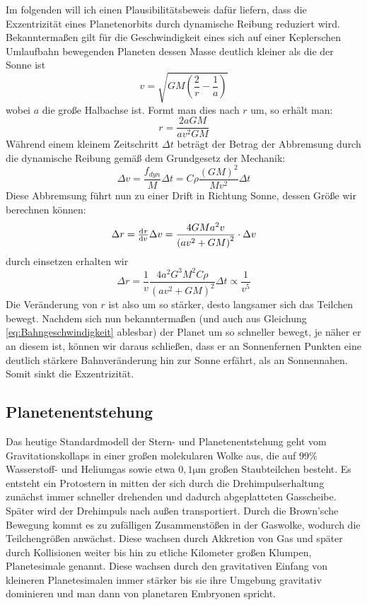 \documentclass[12pt,a4paper,twoside]{article}
\renewcommand{\cite}{\citep}
\begin{document}
Im folgenden will ich einen Plausibilitätsbeweis dafür liefern, dass die Exzentrizität eines Planetenorbits durch dynamische Reibung reduziert wird.
Bekanntermaßen gilt für die Geschwindigkeit eines sich auf einer Keplerschen Umlaufbahn bewegenden Planeten dessen Masse deutlich kleiner als die der Sonne ist
\begin{equation}\label{eq:Bahngeschwindigkeit}
v= \sqrt{GM\left(\frac{2}{r}-\frac{1}{a}\right)}
\end{equation}
wobei $a$ die große Halbachse ist. Formt man dies nach $r$ um, so erhält man:
\begin{equation}
r = \frac{2aGM}{av^2GM}
\end{equation}
Während einem kleinem Zeitschritt $\Delta t$ beträgt der Betrag der Abbremsung durch die dynamische Reibung gemäß dem Grundgesetz der Mechanik:
\begin{equation}
\Delta v = \frac{f_{dyn}}{M} \Delta t = C \rho \frac{\left(GM\right)^2}{Mv^2} \Delta t
\end{equation}
Diese Abbremsung führt nun zu einer Drift in Richtung Sonne, dessen Größe wir berechnen können:
\begin{equation}
\Delta r = \od{r}{v}\Delta v = \frac{4GMa^2v}{\left(av^2+GM\right)^2} \cdot \Delta v
\end{equation}
durch einsetzen erhalten wir
\begin{equation}
\Delta r = \frac{1}{v} \frac{4a^2G^3M^2 C \rho}{\left(av^2+GM\right)^2}  \Delta t \propto \frac{1}{v^5}
\end{equation} %
Die Veränderung von $r$ ist also um so stärker, desto langsamer sich das Teilchen bewegt. Nachdem sich nun bekanntermaßen (und auch aus Gleichung \ref{eq:Bahngeschwindigkeit} ablesbar) der Planet um so schneller bewegt, je näher er an diesem ist, können wir daraus schließen, dass er an Sonnenfernen Punkten eine deutlich stärkere Bahnveränderung hin zur Sonne erfährt, als an Sonnennahen. Somit sinkt die Exzentrizität.

\subsection{Planetenentstehung} %
Das heutige Standardmodell der Stern- und Planetenentstehung geht vom Gravitationskollaps in einer großen molekularen Wolke aus, die auf 99\% Wasserstoff- und Heliumgas sowie etwa $0,1\mathrm{\mu m}$ großen Staubteilchen besteht\cite{Hanslmeier2002}. Es entsteht ein Protostern in mitten der sich durch die Drehimpulserhaltung zunächst immer schneller drehenden und dadurch abgeplatteten Gasscheibe.
Später wird der Drehimpuls nach außen transportiert. %
Durch die Brown'sche Bewegung kommt es zu zufälligen Zusammenstößen in der Gaswolke, wodurch die Teilchengrößen anwächst. Diese wachsen durch Akkretion von Gas und später durch Kollisionen weiter bis hin zu etliche Kilometer großen Klumpen, Planetesimale genannt.
Diese wachsen durch den gravitativen Einfang von kleineren Planetesimalen immer stärker bis sie ihre Umgebung gravitativ dominieren und man dann von planetaren Embryonen spricht.
\end{document}
